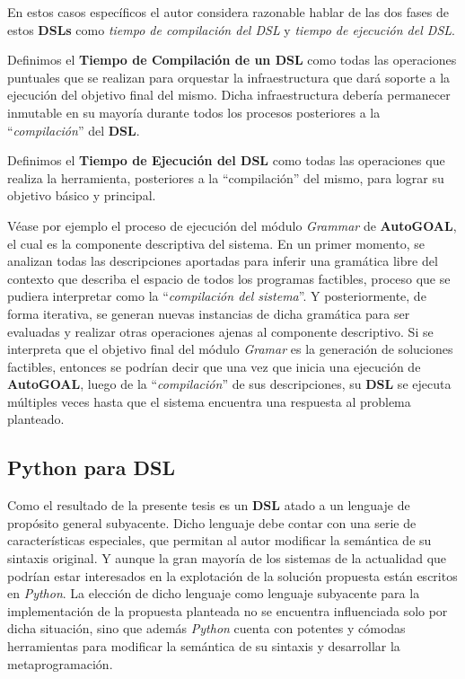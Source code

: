 En estos casos específicos el autor considera razonable hablar de las dos fases de
estos {\bf DSLs} como {\it tiempo de compilación del DSL} y
    {\it tiempo de ejecución del DSL}.


\begin{definition}
      Definimos el {\bf Tiempo de Compilación de un DSL} como todas las operaciones puntuales que se
      realizan para orquestar la infraestructura que dará soporte a la ejecución del objetivo
      final del mismo. Dicha infraestructura debería permanecer inmutable en su mayoría
      durante todos los procesos posteriores a la ``{\it compilación}'' del {\bf DSL}. 
\end{definition}

\begin{definition}

      Definimos el {\bf Tiempo de Ejecución del DSL} como todas las operaciones que realiza
      la herramienta, posteriores a la ``compilación'' del mismo, para lograr su objetivo básico y
      principal.
\end{definition}

Véase por ejemplo el proceso de ejecución del módulo {\it Grammar} de {\bf AutoGOAL}, el cual es
la componente descriptiva del sistema. En un primer momento, se analizan todas las descripciones
aportadas para inferir una gramática libre del contexto que describa el espacio de todos los
programas factibles, proceso que se pudiera interpretar como la ``{\it compilación del sistema}''. Y
posteriormente, de forma iterativa, se generan nuevas instancias de dicha gramática para ser
evaluadas y realizar otras operaciones ajenas al componente descriptivo. Si se interpreta que
el objetivo final del módulo {\it Gramar} es la generación de soluciones factibles, entonces se
podrían decir que una vez que inicia una ejecución de {\bf AutoGOAL}, luego de la ``{\it compilación}''
de sus descripciones, su {\bf DSL} se ejecuta múltiples veces hasta que el sistema encuentra una
respuesta al problema planteado.

\subsection{Python para DSL}

Como el resultado de la presente tesis es un {\bf DSL} atado a un lenguaje de propósito general
subyacente. Dicho lenguaje debe contar con una serie de características especiales,
que permitan al autor modificar la semántica de su sintaxis original. Y aunque la gran mayoría
de los sistemas de la actualidad que podrían estar interesados en la explotación de la solución
propuesta están escritos en {\it Python}. La elección de dicho lenguaje como lenguaje subyacente
para la implementación de la propuesta planteada no se encuentra influenciada solo por dicha
situación, sino que además {\it Python} cuenta con potentes y cómodas herramientas para modificar
la semántica de su sintaxis y desarrollar la metaprogramación.

